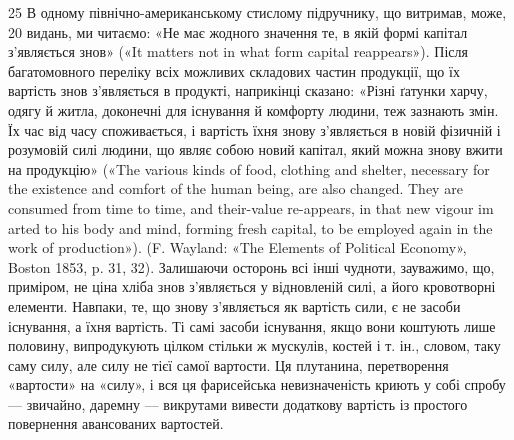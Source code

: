 25 В одному північно-американському стислому підручнику, що витримав,
може, 20 видань, ми читаємо: «Не має жодного значення те, в
якій формі капітал з’являється знов» («It matters not in what form capital
reappears»). Після багатомовного переліку всіх можливих складових
частин продукції, що їх вартість знов з’являється в продукті, наприкінці
сказано: «Різні ґатунки харчу, одягу й житла, доконечні для існування
й комфорту людини, теж зазнають змін. Їх час від часу споживається, і
вартість їхня знову з’являється в новій фізичній і розумовій силі людини, що
являє собою новий капітал, який можна знову вжити на продукцію» («The
various kinds of food, clothing and shelter, necessary for the existence and
comfort of the human being, are also changed. They are consumed from time
to time, and their-value re-appears, in that new vigour im arted to his
body and mind, forming fresh capital, to be employed again in the work
of production»). (F. Wayland: «The Elements of Political Economy»,
Boston 1853, p. 31, 32). Залишаючи осторонь всі інші чудноти, зауважимо,
що, приміром, не ціна хліба знов з’являється у відновленій силі,
а його кровотворні елементи. Навпаки, те, що знову з’являється як вартість
сили, є не засоби існування, а їхня вартість. Ті самі засоби існування,
якщо вони коштують лише половину, випродукують цілком стільки ж
мускулів, костей і т. ін., словом, таку саму силу, але силу не тієї самої
вартости. Ця плутанина, перетворення «вартости» на «силу», і вся ця
фарисейська невизначеність криють у собі спробу — звичайно, даремну —
викрутами вивести додаткову вартість із простого повернення авансованих
вартостей.
